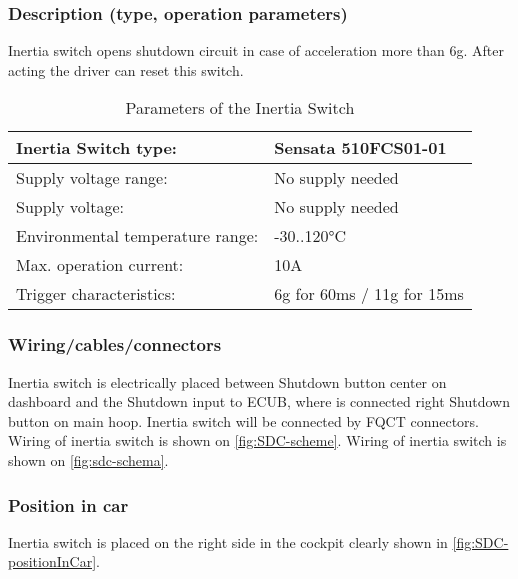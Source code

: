 \subsubsection{Description (type, operation parameters)}
\iffalse Describe the Inertia Switch used and use a table for the common operation parameters, like supply voltage, temperature, etc.
Additionally, fill out the following table replacing the values with your specification: \fi

Inertia switch opens shutdown circuit in case of acceleration more than 6g. After acting the driver can reset this switch.
\begin{table}[H]
	\centering
	\caption{Parameters of the Inertia Switch}
	\begin{tabularx}{\textwidth}{|X|l|}
	\hline	Inertia Switch type: & Sensata 510FCS01-01 \\[\TableSize]
	\hline	Supply voltage range: & No supply needed \\[\TableSize]
	\hline	Supply voltage: & No supply needed \\[\TableSize]
	\hline	Environmental temperature range: & -30..120°C \\[\TableSize]
	\hline	Max. operation current: & 10A \\[\TableSize]
	\hline	Trigger characteristics: & 6g for 60ms / 11g for 15ms \\[\TableSize]
	\hline
	\end{tabularx}%
	\label{tab:inertiaSwitch}%
\end{table}%


\subsubsection{Wiring/cables/connectors}

Inertia switch is electrically placed between Shutdown button center on dashboard and the Shutdown input to ECUB, where is connected right Shutdown button on main hoop. Inertia switch will be connected by FQCT connectors. Wiring of inertia switch is shown on \ref{fig:SDC-scheme}. Wiring of inertia switch is shown on \ref{fig:sdc-schema}.
\subsubsection{Position in car}

Inertia switch is placed on the right side in the cockpit clearly shown in \ref{fig:SDC-positionInCar}.